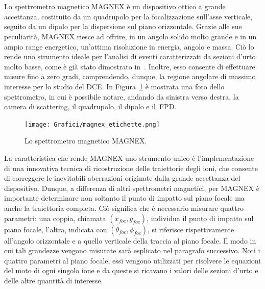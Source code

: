 \section{}

Lo spettrometro magnetico MAGNEX è un dispositivo ottico a grande accettanza, costituito da un quadrupolo per la focalizzazione sull'asse verticale, seguito da un dipolo per la dispersione sul piano orizzontale.
Grazie alle sue peculiarità,  MAGNEX riesce ad offrire, in un angolo solido molto grande e in un ampio range energetico, un'ottima risoluzione in energia, angolo e massa.
Ciò lo rende uno strumento ideale per l'analisi di eventi caratterizzati da sezioni d'urto molto basse, come è già stato dimostrato in~\cite{cappuzzello:epja16,pereira:plb12,oliveira:jpg13}.
Inoltre, esso consente di effettuare misure fino a zero gradi, comprendendo, dunque, la regione angolare di massimo interesse per lo studio del DCE.
In Figura~\ref{fig:magnex} è mostrata una foto dello spettrometro, in cui è possibile notare, andando da sinistra verso destra, la camera di scattering, il quadrupolo, il dipolo e il~FPD.


\begin{figure} [!t]
	\centering
	\texttt{[image: Grafici/magnex\_etichette.png]}
	\caption{Lo spettrometro magnetico MAGNEX.} \label{fig:magnex}
\end{figure}


La caratteristica che rende MAGNEX uno strumento unico è l'implementazione di una innovativa tecnica di ricostruzione delle traiettorie degli ioni, che consente di correggere le inevitabili aberrazioni originate dalla grande accettanza del dispositivo.
Dunque, a differenza di altri spettrometri magnetici, per MAGNEX è importante determinare non soltanto il punto di impatto sul piano focale ma anche la traiettoria completa. Ciò significa che è necessario misurare quattro parametri: una coppia, chiamata $(x_{foc}, y_{foc})$, individua il punto di impatto sul piano focale, l'altra, indicata con $(\theta_{foc}, \phi_{foc})$, si riferisce rispettivamente all'angolo orizzontale e a quello verticale della traccia al piano focale.
Il modo in cui tali grandezze vengono misurate sarà esplicato nel paragrafo successivo.
%
%
%
Noti i quattro parametri al piano focale, essi vengono utilizzati per risolvere le equazioni del moto di ogni singolo ione e da queste si ricavano i valori delle sezioni d'urto e delle altre quantità di interesse. 




